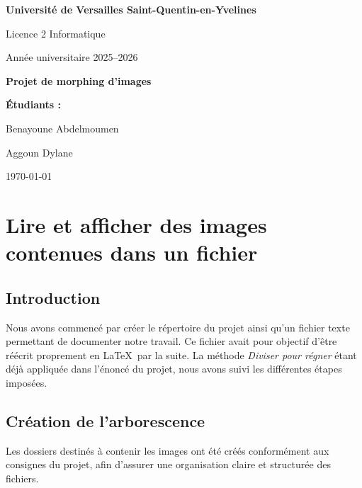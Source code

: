 \documentclass[11pt,a4paper]{article}
\begin{document}
	
	\begin{titlepage}
		\centering
		
		{\Large \textbf{Université de Versailles Saint-Quentin-en-Yvelines}\par}
		\vspace{0.5cm}
		{\large Licence 2 Informatique\par}
		\vspace{0.5cm}
		{\large Année universitaire 2025--2026\par}
		
		\vspace{2cm}
		
		{\Huge \textbf{Projet de morphing d’images}\par}
		
		\vspace{2cm}
		
		\textbf{Étudiants :}\par
		Benayoune Abdelmoumen\par
		Aggoun Dylane\par
		
		\vfill
		\today
		
	\end{titlepage}
	
	\tableofcontents
	\newpage
	
	\section{Lire et afficher des images contenues dans un fichier}
	
	\subsection{Introduction}
	Nous avons commencé par créer le répertoire du projet ainsi qu’un fichier texte permettant de documenter notre travail. Ce fichier avait pour objectif d’être réécrit proprement en \LaTeX\ par la suite.  
	La méthode \emph{Diviser pour régner} étant déjà appliquée dans l’énoncé du projet, nous avons suivi les différentes étapes imposées.
	
	\subsection{Création de l’arborescence}
	Les dossiers destinés à contenir les images ont été créés conformément aux consignes du projet, afin d’assurer une organisation claire et structurée des fichiers.
	
\end{document}
